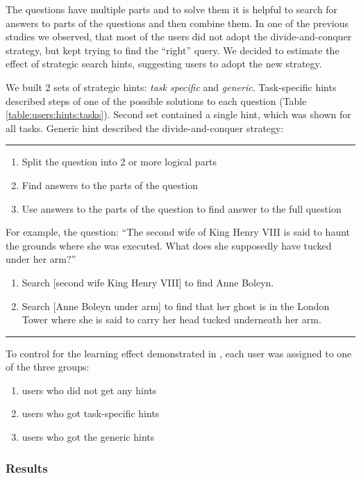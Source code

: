 The questions have multiple parts and to solve them it is helpful to search for answers to parts of the questions and then combine them.
In one of the previous studies we observed, that most of the users did not adopt the divide-and-conquer strategy, but kept trying to find the ``right'' query.
We decided to estimate the effect of strategic search hints, suggesting users to adopt the new strategy.

We built 2 sets of strategic hints: \textit{task specific} and \textit{generic}.
Task-specific hints described steps of one of the possible solutions to each question (Table \ref{table:users:hints:tasks}).
Second set contained a single hint, which was shown for all tasks. Generic hint described the divide-and-conquer strategy:\\
\hrule
\begin{enumerate}
\item Split the question into 2 or more logical parts
\item Find answers to the parts of the question
\item Use answers to the parts of the question to find answer to the full question
\end{enumerate}

For example, the question: ``The second wife of King Henry VIII is said to haunt the grounds where she was executed. What does she supposedly have tucked under her arm?''
\begin{enumerate}
\item Search [second wife King Henry VIII] to find Anne Boleyn.
\item Search [Anne Boleyn under arm] to find that her ghost is in the London Tower where she is said to carry her head tucked underneath her arm.
\end{enumerate}
\hrule

To control for the learning effect demonstrated in \cite{Moraveji:2011:MIU:2009916.2009966}, each user was assigned to one of the three groups:
\begin{enumerate}
\item users who did not get any hints
\item users who got task-specific hints
\item users who got the generic hints
\end{enumerate}


\subsubsection{Results}
\label{section:users:hints:results}

